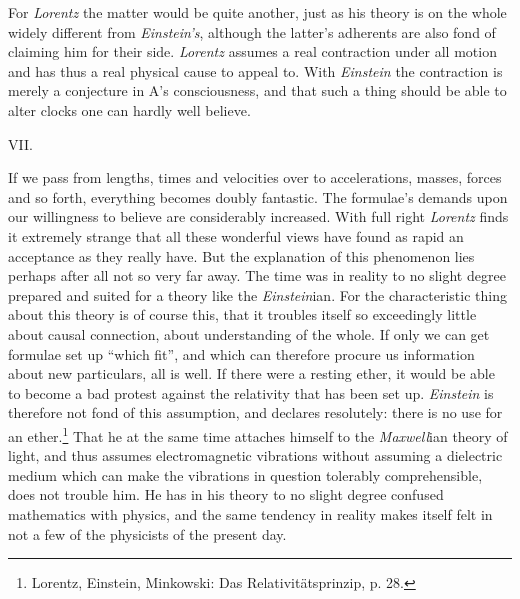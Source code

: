 \documentclass[12pt,a4paper]{article}
\begin{document}
For \emph{Lorentz} the matter would be quite another, just as his theory is on
the whole widely different from \emph{Einstein's}, although the latter's
adherents are also fond of claiming him for their side. \emph{Lorentz} assumes
a real contraction under all motion and has thus a real physical cause to
appeal to. With \emph{Einstein} the contraction is merely a conjecture in A's
consciousness, and that such a thing should be able to alter clocks one can
hardly well believe.

\begin{center}
VII.
\end{center}

If we pass from lengths, times and velocities over to accelerations, masses,
forces and so forth, everything becomes doubly fantastic. The formulae's
demands upon our willingness to believe are considerably increased. With full
right \emph{Lorentz} finds it extremely strange that all these wonderful views
have found as rapid an acceptance as they really have. But the explanation of
this phenomenon lies perhaps after all not so very far away. The time was in
reality to no slight degree prepared and suited for a theory like the
\emph{Einstein}ian. For the characteristic thing about this theory is of
course this, that it troubles itself so exceedingly little about causal
connection, about understanding of the whole. If only we can get formulae set
up ``which fit'', and which can therefore procure us information about new
particulars, all is well. If there were a resting ether, it would be able to
become a bad protest against the relativity that has been set up.
\emph{Einstein} is therefore not fond of this assumption, and declares
resolutely: there is no use for an ether.\footnote{Lorentz, Einstein,
Minkowski: Das Relativitätsprinzip, p. 28.} That he at the same time attaches
himself to the \emph{Maxwell}ian theory of light, and thus assumes
electromagnetic vibrations without assuming a dielectric medium which can make
the vibrations in question tolerably comprehensible, does not trouble him. He
has in his theory to no slight degree confused mathematics with physics, and
the same tendency in reality makes itself felt in not a few of the physicists
of the present day.
\end{document}

